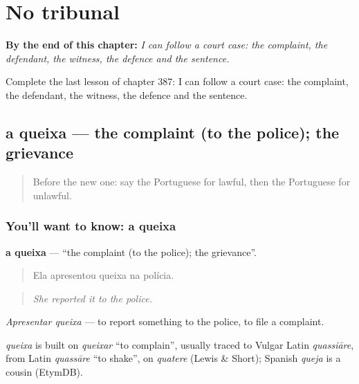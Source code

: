 
\chapter{No tribunal}
\label{ch:pt-no-tribunal}

\begin{chapteropening}
\textbf{By the end of this chapter:} \emph{I can follow a court case: the complaint, the defendant, the witness, the defence and the sentence.}

Complete the last lesson of chapter 387: I can follow a court case: the complaint, the defendant, the witness, the defence and the sentence.
\end{chapteropening}

\section[a queixa]{a queixa — the complaint (to the police); the grievance}

\label{lesson:PT-C387-queixa}



\begin{quote}
Before the new one: say the Portuguese for lawful, then the Portuguese for unlawful.
\end{quote}

\subsection*{You'll want to know: a queixa}
\textbf{a queixa} — \textquotedblleft{}the complaint (to the police); the grievance\textquotedblright{}.

\begin{quote}
Ela apresentou queixa na polícia.
\end{quote}

\begin{quote}
\emph{She reported it to the police.}
\end{quote}

\emph{Apresentar queixa} — to report something to the police, to file a complaint.

\begin{cousinweb}
\emph{queixa} is built on \emph{queixar} \textquotedblleft{}to complain\textquotedblright{}, usually traced to Vulgar Latin \emph{quassiāre}, from Latin \emph{quassāre} \textquotedblleft{}to shake\textquotedblright{}, on \emph{quatere} (Lewis \& Short); Spanish \emph{queja} is a cousin (EtymDB).
\end{cousinweb}

